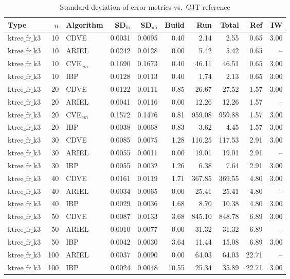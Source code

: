\begin{table}[ht]
\centering
\scriptsize
\caption{Standard deviation of error metrics vs.\ CJT reference}
\begin{tabular}{lrlrrrrrrr}
\toprule
Type & $n$ & Algorithm & SD$_{\text{lb}}$ & SD$_{\text{ub}}$ & Build & Run & Total & Ref & IW \\
\midrule
$\text{ktree\_fr\_k3}$ & 10 & CDVE & 0.0031 & 0.0095 & 0.40 & 2.14 & 2.55 & 0.65 & 3.00 \\
$\text{ktree\_fr\_k3}$ & 10 & ARIEL & 0.0242 & 0.0128 & 0.00 & 5.42 & 5.42 & 0.65 & -- \\
$\text{ktree\_fr\_k3}$ & 10 & CVE$_{cm}$ & 0.1690 & 0.1673 & 0.40 & 46.11 & 46.51 & 0.65 & 3.00 \\
$\text{ktree\_fr\_k3}$ & 10 & IBP & 0.0128 & 0.0113 & 0.40 & 1.74 & 2.13 & 0.65 & 3.00 \\
\hline
$\text{ktree\_fr\_k3}$ & 20 & CDVE & 0.0122 & 0.0111 & 0.85 & 26.67 & 27.52 & 1.57 & 3.00 \\
$\text{ktree\_fr\_k3}$ & 20 & ARIEL & 0.0041 & 0.0116 & 0.00 & 12.26 & 12.26 & 1.57 & -- \\
$\text{ktree\_fr\_k3}$ & 20 & CVE$_{cm}$ & 0.1572 & 0.1476 & 0.81 & 959.08 & 959.88 & 1.57 & 3.00 \\
$\text{ktree\_fr\_k3}$ & 20 & IBP & 0.0038 & 0.0068 & 0.83 & 3.62 & 4.45 & 1.57 & 3.00 \\
\hline
$\text{ktree\_fr\_k3}$ & 30 & CDVE & 0.0085 & 0.0075 & 1.28 & 116.25 & 117.53 & 2.91 & 3.00 \\
$\text{ktree\_fr\_k3}$ & 30 & ARIEL & 0.0055 & 0.0011 & 0.00 & 19.01 & 19.01 & 2.91 & -- \\
$\text{ktree\_fr\_k3}$ & 30 & IBP & 0.0055 & 0.0032 & 1.26 & 6.38 & 7.64 & 2.91 & 3.00 \\
\hline
$\text{ktree\_fr\_k3}$ & 40 & CDVE & 0.0161 & 0.0119 & 1.71 & 367.85 & 369.55 & 4.80 & 3.00 \\
$\text{ktree\_fr\_k3}$ & 40 & ARIEL & 0.0034 & 0.0065 & 0.00 & 25.41 & 25.41 & 4.80 & -- \\
$\text{ktree\_fr\_k3}$ & 40 & IBP & 0.0029 & 0.0036 & 1.68 & 8.70 & 10.38 & 4.80 & 3.00 \\
\hline
$\text{ktree\_fr\_k3}$ & 50 & CDVE & 0.0087 & 0.0133 & 3.68 & 845.10 & 848.78 & 6.89 & 3.00 \\
$\text{ktree\_fr\_k3}$ & 50 & ARIEL & 0.0010 & 0.0077 & 0.00 & 31.32 & 31.32 & 6.89 & -- \\
$\text{ktree\_fr\_k3}$ & 50 & IBP & 0.0042 & 0.0030 & 3.64 & 11.44 & 15.08 & 6.89 & 3.00 \\
\hline
$\text{ktree\_fr\_k3}$ & 100 & ARIEL & 0.0037 & 0.0090 & 0.00 & 64.03 & 64.03 & 22.71 & -- \\
$\text{ktree\_fr\_k3}$ & 100 & IBP & 0.0024 & 0.0048 & 10.55 & 25.34 & 35.89 & 22.71 & 3.00 \\
\bottomrule
\end{tabular}
\end{table}
